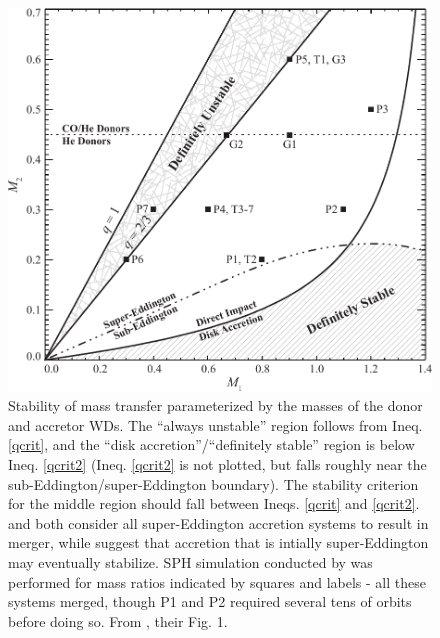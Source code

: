 \begin{figure}
\centerline{\includegraphics[width=0.8\hsize]{stabilityfig.pdf}}
\caption{Stability of mass transfer parameterized by the masses of the donor and accretor WDs.  The ``always unstable'' region follows from Ineq. \ref{qcrit}, and the ``disk accretion''/``definitely stable'' region is below Ineq. \ref{qcrit2} (Ineq. \ref{qcrit2} is not plotted, but falls roughly near the sub-Eddington/super-Eddington boundary).  The stability criterion for the middle region should fall between Ineqs. \ref{qcrit} and \ref{qcrit2}.  \citeauthor{hanw99} and \citeauthor{marsns04} both consider all super-Eddington accretion systems to result in merger, while \citeauthor{gokhpf07} suggest that accretion that is intially super-Eddington may eventually stabilize.  SPH simulation conducted by \citeauthor{dan+11} was performed for mass ratios indicated by squares and labels - all these systems merged, though P1 and P2 required several tens of orbits before doing so.  From \cite{dan+11}, their Fig. 1.}
\label{stabilityfig}
\end{figure}

